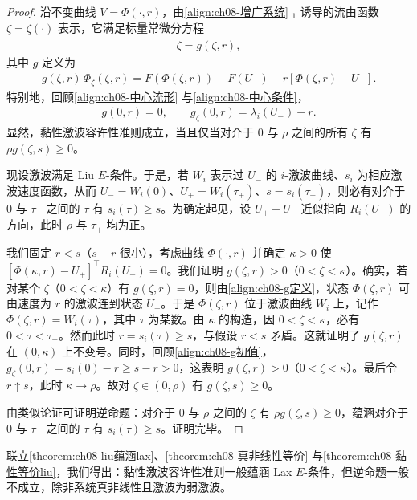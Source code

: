 \documentclass[../../main.tex]{subfiles}
\begin{document}
\begin{proof}
沿不变曲线 $V=\Phi(\cdot,r)$，由\eqref{align:ch08-增广系统} $_1$ 诱导的流由函数 $\zeta=\zeta(\cdot)$ 表示，它满足标量常微分方程
\begin{align}
\dot\zeta=g(\zeta,r),
\label{align:ch08-gzeta}
\end{align}
其中 $g$ 定义为
\begin{align}
g(\zeta,r)\,\Phi_\zeta(\zeta,r)=F(\Phi(\zeta,r))-F(U_-)-r[\Phi(\zeta,r)-U_-].
\label{align:ch08-g定义}
\end{align}
特别地，回顾\eqref{align:ch08-中心流形} 与\eqref{align:ch08-中心条件}，
\begin{align}
g(0,r)=0,\qquad g_\zeta(0,r)=\lambda_i(U_-)-r.
\label{align:ch08-g初值}
\end{align}
显然，黏性激波容许性准则成立，当且仅当对介于 $0$ 与 $\rho$ 之间的所有 $\zeta$ 有 $\rho g(\zeta,s)\geqslant0$。

现设激波满足 Liu $E$-条件。于是，若 $W_i$ 表示过 $U_-$ 的 $i$-激波曲线、$s_i$ 为相应激波速度函数，从而 $U_-=W_i(0)$、$U_+=W_i(\tau_+)$、$s=s_i(\tau_+)$，则必有对介于 $0$ 与 $\tau_+$ 之间的 $\tau$ 有 $s_i(\tau)\geqslant s$。为确定起见，设 $U_+-U_-$ 近似指向 $R_i(U_-)$ 的方向，此时 $\rho$ 与 $\tau_+$ 均为正。

我们固定 $r<s$（$s-r$ 很小），考虑曲线 $\Phi(\cdot,r)$ 并确定 $\kappa>0$ 使 $[\Phi(\kappa,r)-U_+]^\top R_i(U_-)=0$。我们证明 $g(\zeta,r)>0$（$0<\zeta<\kappa$）。确实，若对某个 $\zeta$（$0<\zeta<\kappa$）有 $g(\zeta,r)=0$，则由\eqref{align:ch08-g定义}，状态 $\Phi(\zeta,r)$ 可由速度为 $r$ 的激波连到状态 $U_-$。于是 $\Phi(\zeta,r)$ 位于激波曲线 $W_i$ 上，记作 $\Phi(\zeta,r)=W_i(\tau)$，其中 $\tau$ 为某数。由 $\kappa$ 的构造，因 $0<\zeta<\kappa$，必有 $0<\tau<\tau_+$。然而此时 $r=s_i(\tau)\geqslant s$，与假设 $r<s$ 矛盾。这就证明了 $g(\zeta,r)$ 在 $(0,\kappa)$ 上不变号。同时，回顾\eqref{align:ch08-g初值}，$g_\zeta(0,r)=s_i(0)-r\geqslant s-r>0$，这表明 $g(\zeta,r)>0$（$0<\zeta<\kappa$）。最后令 $r\uparrow s$，此时 $\kappa\to\rho$。故对 $\zeta\in(0,\rho)$ 有 $g(\zeta,s)\geqslant0$。

由类似论证可证明逆命题：对介于 $0$ 与 $\rho$ 之间的 $\zeta$ 有 $\rho g(\zeta,s)\geqslant0$，蕴涵对介于 $0$ 与 $\tau_+$ 之间的 $\tau$ 有 $s_i(\tau)\geqslant s$。证明完毕。
\end{proof}

联立\cref{theorem:ch08-liu蕴涵lax}、\cref{theorem:ch08-真非线性等价} 与\cref{theorem:ch08-黏性等价liu}，我们得出：黏性激波容许性准则一般蕴涵 Lax $E$-条件，但逆命题一般不成立，除非系统真非线性且激波为弱激波。
\end{document}
